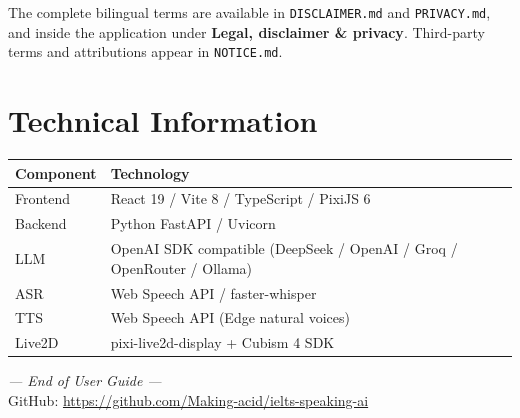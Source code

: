 \documentclass[12pt,a4paper]{article}
\begin{document}
The complete bilingual terms are available in \texttt{DISCLAIMER.md} and \texttt{PRIVACY.md}, and inside the application under \textbf{Legal, disclaimer \& privacy}. Third-party terms and attributions appear in \texttt{NOTICE.md}.

\section{Technical Information}

\begin{tabularx}{\textwidth}{lX}
  \hline
  Component & Technology \\
  \hline
  Frontend & React 19 / Vite 8 / TypeScript / PixiJS 6 \\
  Backend & Python FastAPI / Uvicorn \\
  LLM & OpenAI SDK compatible (DeepSeek / OpenAI / Groq / OpenRouter / Ollama) \\
  ASR & Web Speech API / faster-whisper \\
  TTS & Web Speech API (Edge natural voices) \\
  Live2D & pixi-live2d-display + Cubism 4 SDK \\
  \hline
\end{tabularx}

\vspace{1.5cm}
\begin{center}
  \textit{--- End of User Guide ---}\\[4pt]
  GitHub: \url{https://github.com/Making-acid/ielts-speaking-ai}
\end{center}
\end{document}
